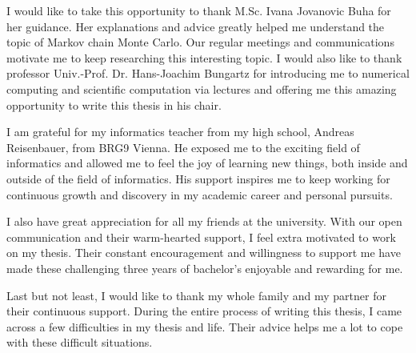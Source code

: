 I would like to take this opportunity to thank M.Sc. Ivana Jovanovic Buha for her guidance. Her explanations and advice greatly helped me understand the topic of Markov chain Monte Carlo. Our regular meetings and communications motivate me to keep researching this interesting topic. I would also like to thank professor Univ.-Prof. Dr. Hans-Joachim Bungartz for introducing me to numerical computing and scientific computation via lectures and offering me this amazing opportunity to write this thesis in his chair.

I am grateful for my informatics teacher from my high school, Andreas Reisenbauer, from BRG9 Vienna. He exposed me to the exciting field of informatics and allowed me to feel the joy of learning new things, both inside and outside of the field of informatics. His support inspires me to keep working for continuous growth and discovery in my academic career and personal pursuits.

I also have great appreciation for all my friends at the university. With our open communication and their warm-hearted support, I feel extra motivated to work on my thesis. Their constant encouragement and willingness to support me have made these challenging three years of bachelor's enjoyable and rewarding for me.

Last but not least, I would like to thank my whole family and my partner for their continuous support. During the entire process of writing this thesis, I came across a few difficulties in my thesis and life. Their advice helps me a lot to cope with these difficult situations.

